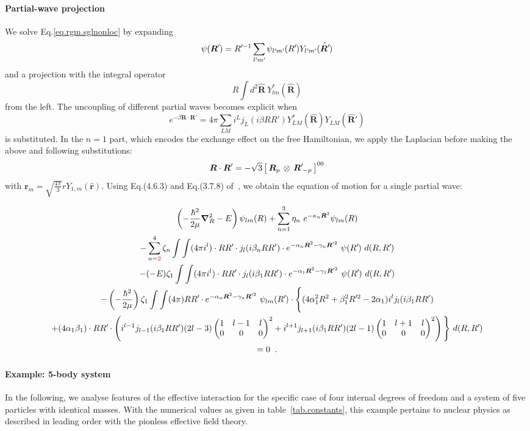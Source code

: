 \documentclass[aps,nofootinbib,prl,showpacs,twocolumn,groupedaddress,superscriptaddress]
{revtex4}
\newcommand*{\mprime}{^{\prime}\mkern-1.2mu}
\newcommand{\red}[1]{\textcolor{red}{#1}}
\newcommand{\be}{\begin{equation}}
\newcommand{\ee}{\end{equation}}
\newcommand{\ve}[1]{\ensuremath{\boldsymbol{#1}}}
\newcommand{\coup}[3]{\left[\,#1\,\otimes\,#2\,\right]^{#3}}
\newcommand{\threej}[6]{ \begin{pmatrix}
   #1 & #2 & #3 \\
   #4 & #5 & #6 
  \end{pmatrix}}
\begin{document}
\paragraph{Partial-wave projection} We solve Eq.\eqref{eq.rgm.sglnonloc} by expanding
\be
\psi(\ve{R}\mprime)=R\mprime^{-1}\sum_{l\mprime m\mprime}\psi_{l\mprime m\mprime}(R\mprime)Y_{l\mprime m\mprime}(\hat{\ve{R}\mprime})
\ee
and a projection with the integral operator
\be
R\int d^2\hat{\ve{R}}~Y^*_{lm}(\hat{\ve{R}})
\ee
from the left. The uncoupling of different partial waves becomes explicit when
\be
e^{-\beta\ve{R}\cdot\ve{R}'}=4\pi\sum_{LM}i^Lj_L(i\beta RR')Y^*_{LM}(\hat{\ve{R}})Y_{LM}(\hat{\ve{R}}')
\ee
is substituted. In the $n=1$ part, which encodes the exchange effect on the free
Hamiltonian, we apply the Laplacian before making the above and following
substitutions:
\be
\ve{R}\cdot\ve{R}'=-\sqrt{3}\coup{\ve{R}_p}{\ve{R}\mprime_{-p}}{00}
\ee
with $\ve{r}_m=\sqrt{\frac{4\pi}{3}}rY_{1,m}(\hat{\ve{r}})$. Using Eq.(4.6.3) and
Eq.(3.7.8) of~\cite{Edmonds}, we obtain the equation of motion for a single
partial wave:
\begin{widetext}
\begin{gather}\label{eq.rgm.sglnonloc.pw}
\left(-\frac{\hbar^2}{2\mu}\ve{\nabla}_R^2-E\right)\psi_{lm}(R)+
\sum_{n=1}^3\eta_n~e^{-\kappa_n\ve{R}^2}\psi_{lm}(R)\\
-\sum_{n=\red{2}}^4\zeta_n\int\int
(4\pi i^l)\cdot RR\mprime\cdot j_l(i\beta_n RR')\cdot e^{-\alpha_n\ve{R}^2-\gamma_n\ve{R}'^2}~\psi(R\mprime)~d(R,R\mprime)\\
-(-E)\zeta_1\int\int
(4\pi i^l)\cdot RR\mprime\cdot j_l(i\beta_1 RR')\cdot e^{-\alpha_1\ve{R}^2-\gamma_1\ve{R}'^2}~\psi(R\mprime)~d(R,R\mprime)\\
-\left(-\frac{\hbar^2}{2\mu}\right)\zeta_1\int\int
(4\pi) RR\mprime\cdot e^{-\alpha_n\ve{R}^2-\gamma_n\ve{R}'^2}~\psi_{lm}(R\mprime)
\cdot\Bigg\lbrace
(4\alpha_1^2R^2+\beta_1^2R\mprime^2-2\alpha_1) i^l j_{l}(i\beta_1 RR')\\
+
(4\alpha_1\beta_1)\cdot RR\mprime\cdot
 \left(i^{l-1} j_{l-1}(i\beta_1 RR') (2l-3)
 \threej{1}{l-1}{l}{0}{0}{0}^2+
 i^{l+1} j_{l+1}(i\beta_1 RR') (2l-1)
 \threej{1}{l+1}{l}{0}{0}{0}^2\right)\Bigg\rbrace
~d(R,R\mprime)\\=0\;\;.
\end{gather}
\end{widetext}

\paragraph{Example: 5-body system}
In the following, we analyse features of the effective interaction for the
specific case of four internal degrees of freedom and a system of five particles
with identical masses. With the numerical values as given in table~\ref{tab.constants},
this example pertains to nuclear physics as described in leading order with the
pionless effective field theory.
\end{document}
